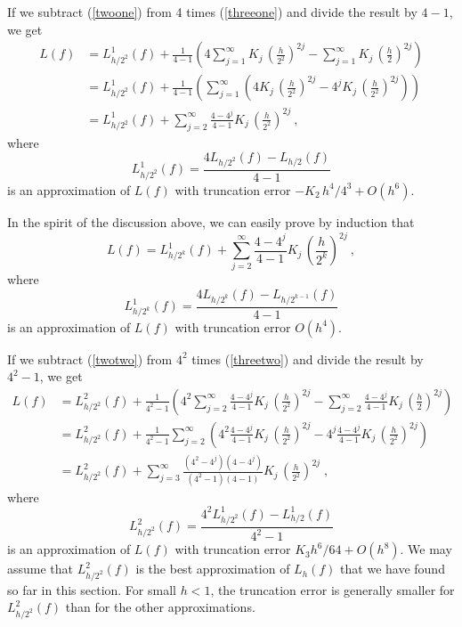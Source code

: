 If we subtract (\ref{twoone}) from 4 times (\ref{threeone}) and divide
the result by $4-1$, we get
\begin{align}
L(f) &= L_{h/2^2}^1(f) + \frac{1}{4-1}\left(
4 \sum_{j=1}^\infty K_j\,\left(\frac{h}{2^2}\right)^{2j}
- \sum_{j=1}^\infty K_j\,\left(\frac{h}{2}\right)^{2j}\right) \nonumber \\
&= L_{h/2^2}^1(f) + \frac{1}{4-1}\left(
\sum_{j=1}^\infty \left( 4 K_j\,\left(\frac{h}{2^2}\right)^{2j}
- 4^j K_j\,\left(\frac{h}{2^2}\right)^{2j}\right) \right) \nonumber \\
&= L_{h/2^2}^1(f) + \sum_{j=2}^\infty \frac{4 - 4^j}{4-1} K_j\,
\left(\frac{h}{2^2}\right)^{2j} \ ,  \label{threetwo}
\end{align}
where
\[
L_{h/2^2}^1(f) = \frac{4L_{h/2^2}(f)-L_{h/2}(f)}{4-1}
\]
is an approximation of $L(f)$ with truncation error
$- K_2\,h^4/4^3 + O(h^6)$.

In the spirit of the discussion above, we can easily prove by
induction that
\begin{equation} \label{ntwo}
L(f) = L_{h/2^k}^1(f) + \sum_{j=2}^\infty \frac{4 - 4^j}{4-1} K_j\,
\left(\frac{h}{2^k}\right)^{2j} \ ,
\end{equation}
where
\[
L_{h/2^k}^1(f) = \frac{4L_{h/2^k}(f)-L_{h/2^{k-1}}(f)}{4-1}
\]
is an approximation of $L(f)$ with truncation error $O(h^4)$.

If we subtract (\ref{twotwo}) from $4^2$ times (\ref{threetwo}) and
divide the result by $4^2-1$, we get
\begin{align}
L(f) &= L_{h/2^2}^2(f) + \frac{1}{4^2-1}\left(
4^2 \sum_{j=2}^\infty \frac{4 - 4^j}{4-1} K_j\,
\left(\frac{h}{2^2}\right)^{2j} -
\sum_{j=2}^\infty \frac{4 - 4^j}{4-1} K_j\,
\left(\frac{h}{2}\right)^{2j} \right) \nonumber \\
&= L_{h/2^2}^2(f) + \frac{1}{4^2-1} \sum_{j=2}^\infty \left(
4^2 \frac{4 - 4^j}{4-1} K_j\, \left(\frac{h}{2^2}\right)^{2j}
- 4^j \frac{4 - 4^j}{4-1} K_j\, \left(\frac{h}{2^2}\right)^{2j}
\right) \nonumber \\
&= L_{h/2^2}^2(f) + \sum_{j=3}^\infty
\frac{(4^2-4^j)(4-4^j)}{(4^2-1)(4-1)}
K_j\, \left(\frac{h}{2^2}\right)^{2j} \; ,  \label{threethree}
\end{align}
where
\[
L_{h/2^2}^2(f) = \frac{4^2L_{h/2^2}^1(f)
  -L_{h/2}^1(f)}{4^2-1}
\]
is an approximation of $L(f)$ with truncation error
$K_3 h^6/64 + O(h^8)$.  We may assume 
that $L_{h/2^2}^2(f)$ is the best approximation of $L_h(f)$ that we
have found so far in this section.  For small $h<1$, the truncation
error is generally smaller for $L_{h/2^2}^2(f)$ than for the other
approximations.

